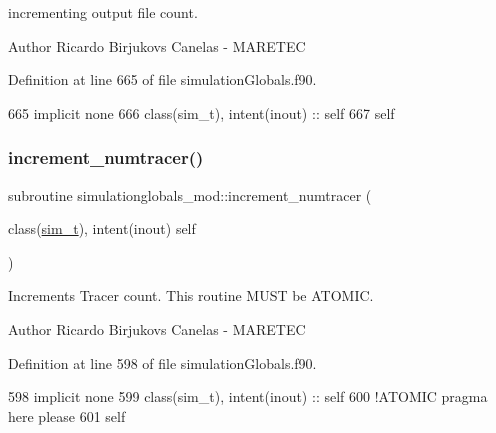 incrementing output file count. 

\begin{DoxyAuthor}{Author}
Ricardo Birjukovs Canelas -\/ M\+A\+R\+E\+T\+EC 
\end{DoxyAuthor}


Definition at line 665 of file simulation\+Globals.\+f90.


\begin{DoxyCode}
665     \textcolor{keywordtype}{implicit none}
666     \textcolor{keywordtype}{class}(sim\_t), \textcolor{keywordtype}{intent(inout)} :: self
667     self%
\end{DoxyCode}
\mbox{\label{namespacesimulationglobals__mod_a3f11ed9f7735018950e1921ead871269}} 
\subsubsection{\texorpdfstring{increment\+\_\+numtracer()}{increment\_numtracer()}}
{\footnotesize\ttfamily subroutine simulationglobals\+\_\+mod\+::increment\+\_\+numtracer (\begin{DoxyParamCaption}\item[{class(\mbox{\hyperlink{structsimulationglobals__mod_1_1sim__t}{sim\+\_\+t}}), intent(inout)}]{self }\end{DoxyParamCaption})\hspace{0.3cm}{\ttfamily [private]}}



Increments Tracer count. This routine M\+U\+ST be A\+T\+O\+M\+IC. 

\begin{DoxyAuthor}{Author}
Ricardo Birjukovs Canelas -\/ M\+A\+R\+E\+T\+EC 
\end{DoxyAuthor}


Definition at line 598 of file simulation\+Globals.\+f90.


\begin{DoxyCode}
598     \textcolor{keywordtype}{implicit none}
599     \textcolor{keywordtype}{class}(sim\_t), \textcolor{keywordtype}{intent(inout)} :: self
600     \textcolor{comment}{!ATOMIC pragma here please}
601     self%
\end{DoxyCode}
\mbox{\label{namespacesimulationglobals__mod_a12410ee549ead4c6d892dca6ead74d15}} 
